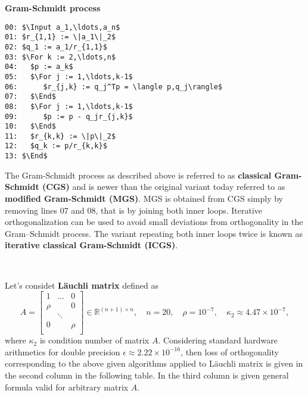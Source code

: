 \documentclass{report}
\newcommand{\Input}{\mathbf{input}\ }
\newcommand{\For}{\mathbf{for}\ }
\newcommand{\End}{\mathbf{end}\ }
\begin{document}

\noindent\textbf{Gram-Schmidt process}



\begin{lstlisting}
00: $\Input a_1,\ldots,a_n$
01: $r_{1,1} := \|a_1\|_2$
02: $q_1 := a_1/r_{1,1}$
03: $\For k := 2,\ldots,n$
04:   $p := a_k$
05:   $\For j := 1,\ldots,k-1$
06:      $r_{j,k} := q_j^Tp = \langle p,q_j\rangle$
07:   $\End$
08:   $\For j := 1,\ldots,k-1$
09:      $p := p - q_jr_{j,k}$
10:   $\End$
11:   $r_{k,k} := \|p\|_2$
12:   $q_k := p/r_{k,k}$
13: $\End$
\end{lstlisting}

\noindent The Gram-Schmidt process as described above is referred to
as \textbf{classical Gram-Schmidt (CGS)} and is newer than the
original variant today referred to as \textbf{modified Gram-Schmidt
  (MGS)}. MGS is obtained from CGS simply by removing lines 07 and 08,
that is by joining both inner loops. Iterative orthogonalization can
be used to avoid small deviations from orthogonality in the
Gram–Schmidt process. The variant repeating both inner loops twice is
known as \textbf{iterative classical Gram-Schmidt (ICGS)}.

~

%
\noindent Let's considet \textbf{L\"auchli matrix} defined as
%
$$
A = \left[\begin{array}{ccc}
    1    & \ldots & 0 \\
    \rho &        & 0 \\
    & \ddots      &   \\
    0    &        & \rho \\
  \end{array}\right] \in \mathbb{R}^{(n+1)\times n},\quad n=20,
  \quad\rho=10^{-7},\quad \kappa_2 \approx 4.47\times 10^{-7},
$$
%
where $\kappa_2$ is condition number of matrix $A$. Considering
standard hardware arithmetics for double precision $\epsilon \approx
2.22\times 10^{-16} $, then loss of orthogonality corresponding to the
above given algorithms applied to L\"auchli matrix is given in the
second column in the following table. In the third column is given
general formula valid for arbitrary matrix $A.$
\end{document}
